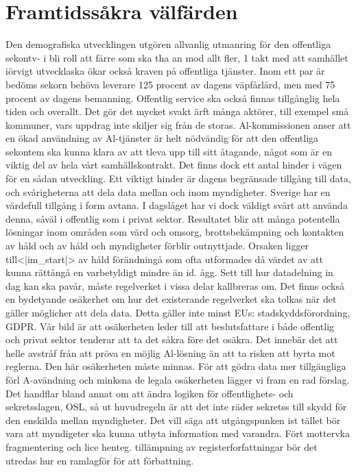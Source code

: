 {\section*{Framtidssåkra välfärden}
Den demografiska utvecklingen utgören allvanlig utmanring för den offentliga sekontv- i bli roll att färre som ska tha an mod allt fler, 1 takt med att samhället iörvigt utvecklaska ökar också kraven på offentliga tjänster. Inom ett par är bedöms sekorn behöva leverare 125 procent av dagens väpfårlård, men med 75 procent av dagens bemanning. Offentlig service ska också finnas tillgånglig hela tiden och overallt. Det gör det mycket svakt ärft många aktörer, till exempel små kommuner, vars uppdrag inte skiljer sig från de storas. Al-kommissionen anser att en ökad användning av Al-tjänster är helt nödvändig för att den offentliga sekontem ska kunna klara av att tleva upp till sitt åtagande, något som är en viktig del av hela vårt samhällskontrakt. Det finns dock ett antal hinder i vägen för en sådan utveckling.
Ett viktigt hinder är dagens begränsade tillgång till data, och svårigheterna att dela data mellan och inom myndigheter. Sverige har en värdefull tillgång i form avtana. I dagslåget har vi dock väldigt svårt att använda denna, såväl i offentlig som i privat sektor. Resultatet blir att många potentella lösningar inom områden som värd och omsorg, brottsbekämpning och kontakten av håld och av håld och myndigheter förblir outnyttjade. Orsaken ligger till<|im_start|> av håld förändningå som ofta utformades då värdet av att kunna rättångå en varbetyldigt mindre än id. ågg. Sett till hur datadelning in dag kan ska pavår, måste regelverket i vissa delar kallbreras om. Det finns också en bydetyande osäkerhet om hur det existerande regelverket ska tolkas när det gäller möglicher att dela data. Detta gäller inte minst EUs: stadskyddsförordning, GDPR. Vår bild är att osäkerheten leder till att beslutsfattare i både offentlig och privat sektor tenderar att ta det såkra före det osäkra. Det innebär det att helle avstråf från att pröva en möjlig Al-lösning än att ta risken att byrta mot reglerna. Den här osäkerheten måste minnas.
För att gödra data mer tillgängliga förl A-avändning och minksna de legala osäkerheten lägger vi fram en rad förslag. Det handflar bland annat om att ändra logiken för offentlighets- och sekretsslagen, OSL, så ut huvudregeln är att det inte räder sekretss till skydd för den enskilda mellan myndigheter. Det vill säga att utgångspunken ist tället bör vara att myndigeter ska kunna utbyta information med varandra. Fört mottervka fragmentering och lice henteg. tillämpning av registerforfattningar bör det utredas hur en ramlagför för att förbattning.
}
